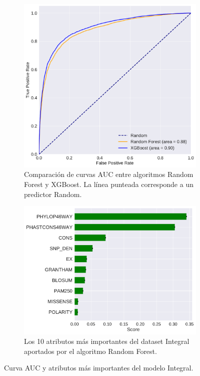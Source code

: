 \begin{figure}[H]
\centering
\begin{subfigure}[t]{0.7\textwidth}
    \centering
    \includegraphics[width=\textwidth]{documents/latex/figures/3/integral/auc_integral.pdf}
    \caption{Comparación de curvas AUC entre algoritmos Random Forest y XGBoost. La línea punteada corresponde a un predictor Random.}
    \label{fig:auc_integral}
\end{subfigure}
\hfill
\hfill
\begin{subfigure}[b]{0.7\textwidth}
    \centering
    \includegraphics[width=\textwidth]{documents/latex/figures/3/integral/importances_integral.pdf}
    \caption{Los 10 atributos más importantes del dataset Integral aportados por el algoritmo Random Forest.}
    \label{fig:importances_integral}
\end{subfigure}

\caption{Curva AUC y atributos más importantes del modelo Integral.}

\end{figure}
